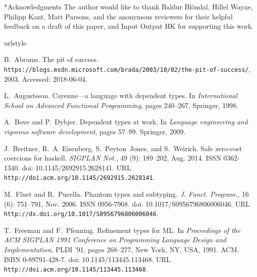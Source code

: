 \documentclass[format=sigplan, review=false, screen=true, 10pt]{acmart}
\makeatletter
\let\origsubsection\subsection
\renewcommand\subsection{\@ifstar{\starsubsection}{\nostarsubsection}}
\newcommand\nostarsubsection[1]
{\subsectionprelude\origsubsection{#1}\subsectionpostlude}
\newcommand\starsubsection[1]
{\subsectionprelude\origsubsection*{#1}\subsectionpostlude}
\newcommand\subsectionprelude{%
  \vspace{-0.25em}
}
\newcommand\subsectionpostlude{%
  \vspace{-0.05em}
}
\makeatother
\begin{document}
\subsection*{Acknowledgments}
\vspace{-0.1em}
The author would like to thank Baldur Bl\"ondal, Hillel Wayne, Philipp Kant, Matt Parsons,
and the anonymous reviewers for
their helpful feedback on a draft of this paper, and Input Output HK for supporting
this work.

%
%

\begin{thebibliography}{22}
\providecommand{\natexlab}[1]{#1}
\providecommand{\url}[1]{\texttt{#1}}
\expandafter\ifx\csname urlstyle\endcsname\relax
  \providecommand{\doi}[1]{doi: #1}\else
  \providecommand{\doi}{doi: \begingroup \urlstyle{rm}\Url}\fi

B.~Abrams.
\newblock The pit of success.
\newblock
  \url{https://blogs.msdn.microsoft.com/brada/2003/10/02/the-pit-of-success/},
  2003.
\newblock Accessed: 2018-06-04.

L.~Augustsson.
\newblock Cayenne—a language with dependent types.
\newblock In \emph{International School on Advanced Functional Programming},
  pages 240--267. Springer, 1998.

A.~Bove and P.~Dybjer.
\newblock Dependent types at work.
\newblock In \emph{Language engineering and rigorous software development},
  pages 57--99. Springer, 2009.

J.~Breitner, R.~A. Eisenberg, S.~Peyton~Jones, and S.~Weirich.
\newblock Safe zero-cost coercions for haskell.
\newblock \emph{SIGPLAN Not.}, 49 (9): 189--202, Aug. 2014.
\newblock ISSN 0362-1340.
\newblock \doi{10.1145/2692915.2628141}.
\newblock URL \url{http://doi.acm.org/10.1145/2692915.2628141}.

M.~Fluet and R.~Pucella.
\newblock Phantom types and subtyping.
\newblock \emph{J. Funct. Program.}, 16 (6): 751--791, Nov.
  2006.
\newblock ISSN 0956-7968.
\newblock \doi{10.1017/S0956796806006046}.
\newblock URL \url{http://dx.doi.org/10.1017/S0956796806006046}.

T.~Freeman and F.~Pfenning.
\newblock Refinement types for {ML}.
\newblock In \emph{Proceedings of the ACM SIGPLAN 1991 Conference on
  Programming Language Design and Implementation}, PLDI '91, pages 268--277,
  New York, NY, USA, 1991. ACM.
\newblock ISBN 0-89791-428-7.
\newblock \doi{10.1145/113445.113468}.
\newblock URL \url{http://doi.acm.org/10.1145/113445.113468}.


\end{thebibliography}
\end{document}
